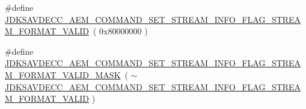 \begin{DoxyCompactItemize}
\item 
\#define \hyperlink{group__command__set__stream__info_gaabb21b3ace105a9429a38a3a2cdfff14}{J\+D\+K\+S\+A\+V\+D\+E\+C\+C\+\_\+\+A\+E\+M\+\_\+\+C\+O\+M\+M\+A\+N\+D\+\_\+\+S\+E\+T\+\_\+\+S\+T\+R\+E\+A\+M\+\_\+\+I\+N\+F\+O\+\_\+\+F\+L\+A\+G\+\_\+\+S\+T\+R\+E\+A\+M\+\_\+\+F\+O\+R\+M\+A\+T\+\_\+\+V\+A\+L\+ID}~( 0x80000000 )
\item 
\#define \hyperlink{group__command__set__stream__info_gab265b262c6d19b3452f09fc0cb20a8b6}{J\+D\+K\+S\+A\+V\+D\+E\+C\+C\+\_\+\+A\+E\+M\+\_\+\+C\+O\+M\+M\+A\+N\+D\+\_\+\+S\+E\+T\+\_\+\+S\+T\+R\+E\+A\+M\+\_\+\+I\+N\+F\+O\+\_\+\+F\+L\+A\+G\+\_\+\+S\+T\+R\+E\+A\+M\+\_\+\+F\+O\+R\+M\+A\+T\+\_\+\+V\+A\+L\+I\+D\+\_\+\+M\+A\+SK}~( $\sim$\hyperlink{group__command__set__stream__info_gaabb21b3ace105a9429a38a3a2cdfff14}{J\+D\+K\+S\+A\+V\+D\+E\+C\+C\+\_\+\+A\+E\+M\+\_\+\+C\+O\+M\+M\+A\+N\+D\+\_\+\+S\+E\+T\+\_\+\+S\+T\+R\+E\+A\+M\+\_\+\+I\+N\+F\+O\+\_\+\+F\+L\+A\+G\+\_\+\+S\+T\+R\+E\+A\+M\+\_\+\+F\+O\+R\+M\+A\+T\+\_\+\+V\+A\+L\+ID} )
\end{DoxyCompactItemize}
